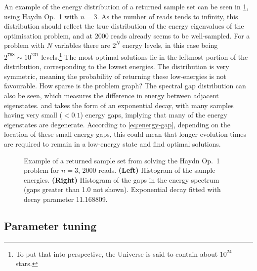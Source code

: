 \documentclass[12pt]{article}
\theoremstyle{definition}
\begin{document}
An example of the energy distribution of a returned sample set can be seen in \cref{fig:histograms}, using Haydn Op.\ 1 with $n=3$. As the number of reads tends to infinity, this distribution should reflect the true distribution of the energy eigenvalues of the optimisation problem, and at \num{2000} reads already seems to be well-sampled. For a problem with $N$ variables there are $2^N$ energy levels, in this case being $2^{768}\sim 10^{231}$ levels.\footnote{To put that into perspective, the Universe is said to contain about $10^{24}$ stars.} The most optimal solutions lie in the leftmost portion of the distribution, corresponding to the lowest energies. The distribution is very symmetric, meaning the probability of returning these low-energies is not favourable. How sparse is the problem graph?
The spectral gap distribution can also be seen, which measures the difference in energy between adjacent eigenstates. and takes the form of an exponential decay, with many samples having very small ($<0.1$) energy gaps, implying that many of the energy eigenstates are degenerate. According to \cref{eq:energy-gap}, depending on the location of these small energy gaps, this could mean that longer evolution times are required to remain in a low-energy state and find optimal solutions.

\begin{figure}[h]
    \centering\footnotesize
    
    \caption{Example of a returned sample set from solving the Haydn Op.\ 1 problem for $n=3$, \num{2000} reads. \textbf{(Left)} Histogram of the sample energies. \textbf{(Right)} Histogram of the gaps in the energy spectrum (gaps greater than \num{1.0} not shown). Exponential decay fitted with decay parameter \num{11.168809}.}
    \label{fig:histograms}
\end{figure}

\subsection{Parameter tuning}
\end{document}
